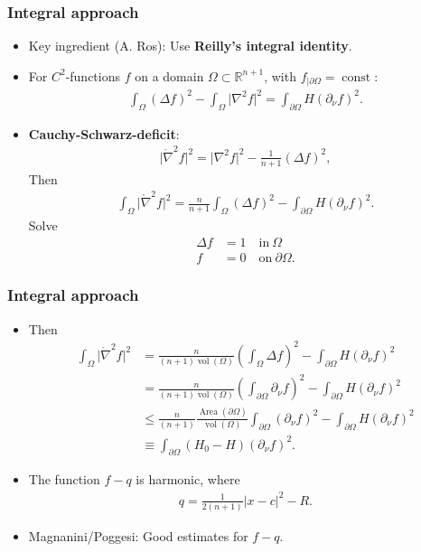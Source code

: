 \documentclass{beamer}
\newcommand{\sub}{\subset}
\newcommand{\mr}{\mathring}
\newcommand{\bbR}{\mathbb{R}}
\newcommand{\8}{\infty}
\newcommand{\Om}{\Omega}
\newcommand{\De}{\Delta}
\newcommand{\del}{\partial}
\newcommand{\n}{\nabla}
\newcommand{\fr}[2]{\frac{#1}{#2}}
\newcommand{\tfr}[2]{\tfrac{#1}{#2}}
\DeclareMathOperator{\const}{const}
\DeclareMathOperator{\vol}{vol}
\DeclareMathOperator{\Area}{Area}
\newcommand{\eq}[1]{\begin{equation}\begin{alignedat}{2} #1 \end{alignedat}\end{equation}}
\newcommand{\br}[1]{\left(#1\right)}
\newcommand{\abs}[1]{\lvert #1\rvert}
\newcommand{\q}{\quad}
\begin{document}
\begin{frame} 
\frametitle{Integral approach}

\begin{itemize}
\item[] Key ingredient (A. Ros): Use {\bf{Reilly's integral identity}}.
\item[] For $C^{2}$-functions $f$ on a domain $\Om\sub\bbR^{n+1}$, with $f_{|\del\Om}=\const$:
\eq{\int_{\Om}(\De f)^{2}-\int_{\Om}\abs{\n^{2}f}^{2}=\int_{\del\Om}H(\del_{\nu}f)^{2}.}
\item[] {\bf{Cauchy-Schwarz-deficit}}:
\eq{\abs{\mr{\n}^{2}f}^{2}=\abs{\n^{2}f}^{2}-\tfr{1}{n+1}(\De f)^{2},}
Then
\eq{\int_{\Om}\abs{\mr{\n}^{2}f}^{2}=\fr{n}{n+1}\int_{\Om}(\De f)^{2}-\int_{\del\Om}H(\del_{\nu}f)^{2}.}
Solve 
\eq{\De f &= 1\q \mbox{in}~\Om\\
		f &= 0 \q \mbox{on}~\del\Om.}
\end{itemize}
\end{frame}

\begin{frame} 
\frametitle{Integral approach}
\begin{itemize}
\item[] Then 
\eq{\int_{\Om}\abs{\mr{\n}^{2}f}^{2}&=\fr{n}{(n+1)\vol(\Om)}\br{\int_{\Om}\De f}^{2}-\int_{\del\Om}H(\del_{\nu}f)^{2}\\
					&=\fr{n}{(n+1)\vol(\Om)}\br{\int_{\del\Om}\del_{\nu}f}^{2}-\int_{\del\Om}H(\del_{\nu}f)^{2}\\
					&\leq \fr{n}{(n+1)}\fr{\Area(\del\Om)}{{\vol(\Om)}}\int_{\del\Om}(\del_{\nu}f)^{2}-\int_{\del\Om}H(\del_{\nu}f)^{2}\\
					&\equiv\int_{\del\Om}(H_{0}-H)(\del_{\nu}f)^{2}.}


\item[] The function $f-q$ is harmonic, where
\eq{q = \fr{1}{2(n+1)}\abs{x-c}^{2}-R.}
\item[] Magnanini/Poggesi: Good estimates for $f-q$.
\end{itemize}
\end{frame}
\end{document}
